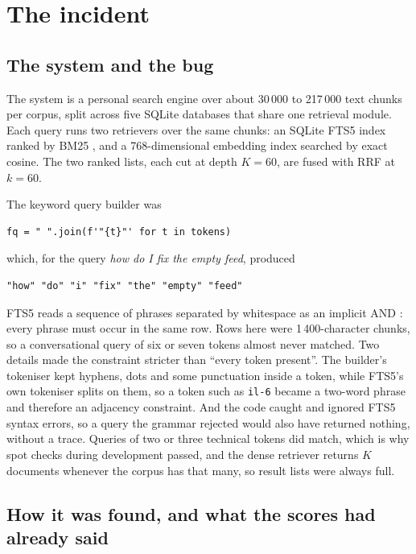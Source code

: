 \documentclass[11pt]{article}
\begin{document}
\section{The incident}
\label{sec:incident}

\subsection{The system and the bug}
\label{sec:bug}

The system is a personal search engine over about 30\,000 to 217\,000 text chunks per corpus, split across five SQLite databases that share one retrieval module. Each query runs two retrievers over the same chunks: an SQLite FTS5 index ranked by BM25 \citep{robertson2009bm25,sqlite_fts5}, and a 768-dimensional embedding index searched by exact cosine. The two ranked lists, each cut at depth $K = 60$, are fused with RRF at $k = 60$.

The keyword query builder was
\begin{verbatim}
fq = " ".join(f'"{t}"' for t in tokens)
\end{verbatim}
which, for the query \emph{how do I fix the empty feed}, produced
\begin{verbatim}
"how" "do" "i" "fix" "the" "empty" "feed"
\end{verbatim}
FTS5 reads a sequence of phrases separated by whitespace as an implicit AND \citep[\S 3]{sqlite_fts5}: every phrase must occur in the same row. Rows here were 1\,400-character chunks, so a conversational query of six or seven tokens almost never matched. Two details made the constraint stricter than ``every token present''. The builder's tokeniser kept hyphens, dots and some punctuation inside a token, while FTS5's own tokeniser splits on them, so a token such as \texttt{il-6} became a two-word phrase and therefore an adjacency constraint. And the code caught and ignored FTS5 syntax errors, so a query the grammar rejected would also have returned nothing, without a trace. Queries of two or three technical tokens did match, which is why spot checks during development passed, and the dense retriever returns $K$ documents whenever the corpus has that many, so result lists were always full.

\subsection{How it was found, and what the scores had already said}
\label{sec:found}
\end{document}
